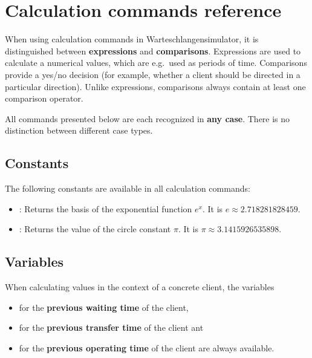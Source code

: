 \part{Calculation commands reference}\label{part:Rechenbefehle}

When using calculation commands in Warteschlangensimulator,
it is distinguished between \textbf{expressions} and \textbf{comparisons}.
Expressions are used to calculate a numerical values, which are e.g.\ used as periods of time.
Comparisons provide a yes/no decision (for example, whether a client should be directed
in a particular direction). Unlike expressions, comparisons always contain at least one comparison operator.

All commands presented below are each recognized in \textbf{any case}.
There is no distinction between different case types.



\chapter{Constants}

The following constants are available in all calculation commands:

\begin{itemize}

\item
{}: Returns the basis of the exponential function $e^x$. It is
$e\approx 2.718281828459$.

\item
{}: Returns the value of the circle constant $\pi$. It is
$\pi\approx 3.1415926535898$.

\end{itemize}



\chapter{Variables}

When calculating values in the context of a concrete client, the variables
\begin{itemize}
\item
{} for the \textbf{previous waiting time} of the client,
\item
{} for the \textbf{previous transfer time} of the client ant
\item
{} for the \textbf{previous operating time} of the client are always available.
\end{itemize}

